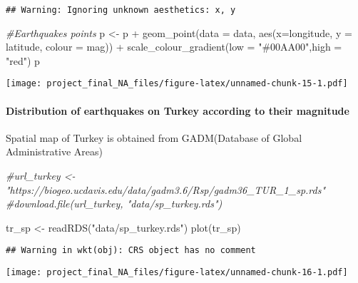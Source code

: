 \documentclass[
]{article}
\newenvironment{Shaded}{\begin{snugshade}}{\end{snugshade}}
\newcommand{\AttributeTok}[1]{\textcolor[rgb]{0.77,0.63,0.00}{#1}}
\newcommand{\CommentTok}[1]{\textcolor[rgb]{0.56,0.35,0.01}{\textit{#1}}}
\newcommand{\FunctionTok}[1]{\textcolor[rgb]{0.00,0.00,0.00}{#1}}
\newcommand{\NormalTok}[1]{#1}
\newcommand{\OtherTok}[1]{\textcolor[rgb]{0.56,0.35,0.01}{#1}}
\newcommand{\SpecialCharTok}[1]{\textcolor[rgb]{0.00,0.00,0.00}{#1}}
\newcommand{\StringTok}[1]{\textcolor[rgb]{0.31,0.60,0.02}{#1}}
\begin{document}
\begin{verbatim}
## Warning: Ignoring unknown aesthetics: x, y
\end{verbatim}

\begin{Shaded}
\begin{Highlighting}[]
\CommentTok{\#Earthquakes points}
\NormalTok{p }\OtherTok{\textless{}{-}}\NormalTok{ p }\SpecialCharTok{+} \FunctionTok{geom\_point}\NormalTok{(}\AttributeTok{data =}\NormalTok{ data, }\FunctionTok{aes}\NormalTok{(}\AttributeTok{x=}\NormalTok{longitude, }\AttributeTok{y =}\NormalTok{ latitude, }\AttributeTok{colour =}\NormalTok{ mag)) }\SpecialCharTok{+} \FunctionTok{scale\_colour\_gradient}\NormalTok{(}\AttributeTok{low =} \StringTok{"\#00AA00"}\NormalTok{,}\AttributeTok{high =} \StringTok{"red"}\NormalTok{)}
\NormalTok{p}
\end{Highlighting}
\end{Shaded}

\texttt{[image: project\_final\_NA\_files/figure-latex/unnamed-chunk-15-1.pdf]}

\hypertarget{distribution-of-earthquakes-on-turkey-according-to-their-magnitude}{%
\paragraph{Distribution of earthquakes on Turkey according to their
magnitude}\label{distribution-of-earthquakes-on-turkey-according-to-their-magnitude}}

Spatial map of Turkey is obtained from GADM(Database of Global
Administrative Areas)

\begin{Shaded}
\begin{Highlighting}[]
\CommentTok{\#url\_turkey \textless{}{-} "https://biogeo.ucdavis.edu/data/gadm3.6/Rsp/gadm36\_TUR\_1\_sp.rds"}
\CommentTok{\#download.file(url\_turkey, "data/sp\_turkey.rds")}

\NormalTok{tr\_sp }\OtherTok{\textless{}{-}} \FunctionTok{readRDS}\NormalTok{(}\StringTok{"data/sp\_turkey.rds"}\NormalTok{)}
\FunctionTok{plot}\NormalTok{(tr\_sp)}
\end{Highlighting}
\end{Shaded}

\begin{verbatim}
## Warning in wkt(obj): CRS object has no comment
\end{verbatim}

\texttt{[image: project\_final\_NA\_files/figure-latex/unnamed-chunk-16-1.pdf]}
\end{document}
